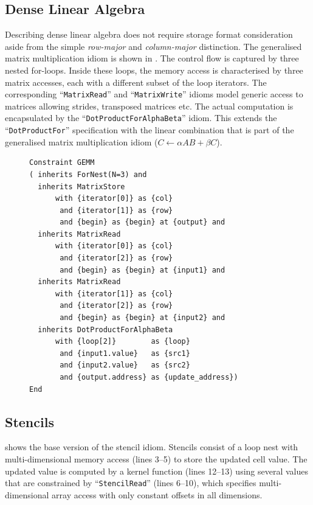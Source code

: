 \subsection{Dense Linear Algebra}

    Describing dense linear algebra does not require storage format
    consideration aside from the simple {\it row-major} and {\it column-major}
    distinction.
    The generalised matrix multiplication idiom is shown in .
    The control flow is captured by three nested for-loops.
    Inside these loops, the memory access is characterised by three matrix
    accesses, each with a different subset of the loop iterators.
    The corresponding ``{\tt MatrixRead}'' and ``{\tt MatrixWrite}'' idioms
    model generic access to matrices allowing strides, transposed matrices etc.
    The actual computation is encapsulated by the
    ``{\tt DotProductForAlphaBeta}'' idiom.
    This extends the ``{\tt DotProductFor}'' specification with the linear
    combination that is part of the generalised matrix multiplication idiom
    ($C\gets\alpha AB+\beta C$).

\begin{figure}[H]
\begin{lstlisting}[language=IDL, label={fig:gemm}, caption=
   {IDL specification of the generalised dense matrix-vector multiplication
    (GEMM)\leftskip=0pt\rightskip=0pt}]
Constraint GEMM
( inherits ForNest(N=3) and
  inherits MatrixStore
      with {iterator[0]} as {col}
       and {iterator[1]} as {row}
       and {begin} as {begin} at {output} and
  inherits MatrixRead
      with {iterator[0]} as {col}
       and {iterator[2]} as {row}
       and {begin} as {begin} at {input1} and
  inherits MatrixRead
      with {iterator[1]} as {col}
       and {iterator[2]} as {row}
       and {begin} as {begin} at {input2} and
  inherits DotProductForAlphaBeta
      with {loop[2]}        as {loop}
       and {input1.value}   as {src1}
       and {input2.value}   as {src2}
       and {output.address} as {update_address})
End
\end{lstlisting}
\end{figure}

\subsection{Stencils}

     shows the base version of the stencil idiom.
    Stencils consist of a loop nest with multi-dimensional memory access
    (lines 3--5) to store the updated cell value.
    The updated value is computed by a kernel function (lines 12--13) using
    several values that are constrained by ``{\tt StencilRead}'' (lines 6--10),
    which specifies multi-dimensional array access with only constant offsets in
    all dimensions.

